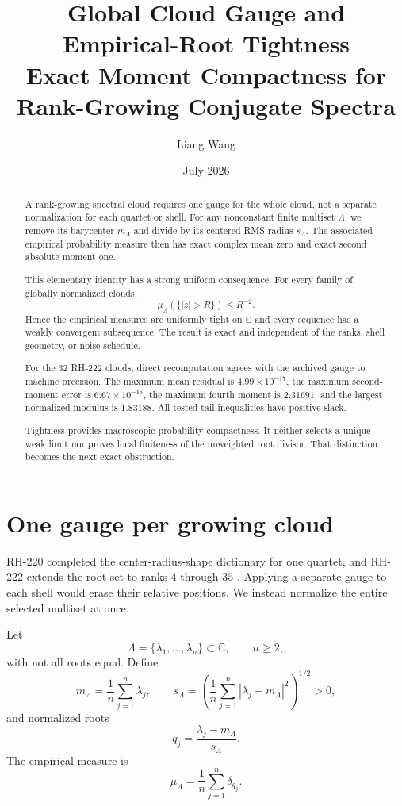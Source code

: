 \documentclass[11pt]{article}
\title{Global Cloud Gauge and Empirical-Root Tightness\\
\large Exact Moment Compactness for Rank-Growing Conjugate Spectra}
\author{Liang Wang}
\date{July 2026}
\theoremstyle{remark}\newtheorem{remark}[theorem]{Remark}
\newcommand{\C}{\mathbb C}
\begin{document}
\maketitle

\begin{abstract}
A rank-growing spectral cloud requires one gauge for the whole cloud, not a
separate normalization for each quartet or shell. For any nonconstant finite
multiset $\Lambda$, we remove its barycenter $m_\Lambda$ and divide by its
centered RMS radius $s_\Lambda$. The associated empirical probability
measure then has exact complex mean zero and exact second absolute moment one.

This elementary identity has a strong uniform consequence. For every family
of globally normalized clouds,
\[
 \mu_\Lambda(\{|z|>R\})\le R^{-2}.
\]
Hence the empirical measures are uniformly tight on $\C$ and every sequence
has a weakly convergent subsequence. The result is exact and independent of
the ranks, shell geometry, or noise schedule.

For the 32 RH-222 clouds, direct recomputation agrees with the archived gauge
to machine precision. The maximum mean residual is
$4.99\times10^{-17}$, the maximum second-moment error is
$6.67\times10^{-16}$, the maximum fourth moment is $2.31691$, and the largest
normalized modulus is $1.83188$. All tested tail inequalities have positive
slack.

Tightness provides macroscopic probability compactness. It neither selects a
unique weak limit nor proves local finiteness of the unweighted root divisor.
That distinction becomes the next exact obstruction.
\end{abstract}

\section{One gauge per growing cloud}

RH-220 completed the center-radius-shape dictionary for one quartet, and
RH-222 extends the root set to ranks $4$ through $35$
\citep{WangRH222}. Applying a separate gauge to each shell would erase their
relative positions. We instead normalize the entire selected multiset at
once.

Let
\[
 \Lambda=\{\lambda_1,\ldots,\lambda_n\}\subset\C,\qquad n\ge2,
\]
with not all roots equal. Define
\begin{equation}\label{eq:gauge}
 m_\Lambda=\frac1n\sum_{j=1}^n\lambda_j,\qquad
 s_\Lambda=\left(\frac1n\sum_{j=1}^n
 |\lambda_j-m_\Lambda|^2\right)^{1/2}>0,
\end{equation}
and normalized roots
\begin{equation}
 q_j=\frac{\lambda_j-m_\Lambda}{s_\Lambda}.
\end{equation}
The empirical measure is
\begin{equation}\label{eq:empirical}
 \mu_\Lambda=\frac1n\sum_{j=1}^n\delta_{q_j}.
\end{equation}
\end{document}
